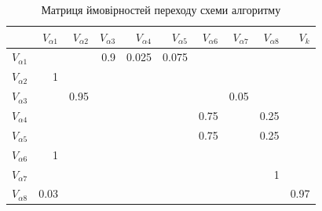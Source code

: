 \documentclass[
	a4paper,
	oneside,
	BCOR = 10mm,
	DIV = 12,
	12pt,
	headings = normal,
]{scrartcl}
\begin{document}
			\begin{table}[!htbp]
				\centering
				\caption{Матриця ймовірностей переходу схеми алгоритму}
				\label{tab:transition-prob}
				\begin{tabular}{
					l
					*{9}{r}
				}
					\toprule
						& $V_{\alpha{}1}$ & $V_{\alpha{}2}$ & $V_{\alpha{}3}$ & $V_{\alpha{}4}$ & $V_{\alpha{}5}$ & $V_{\alpha{}6}$ & $V_{\alpha{}7}$ & $V_{\alpha{}8}$ & $V_{k}$ \\ 
					\midrule
						$V_{\alpha{}1}$ & & & \num{0.9} & \num{0.025} & \num{0.075}\\
						$V_{\alpha{}2}$ & \num{1} \\
						$V_{\alpha{}3}$ & & \num{0.95} & & & & & \num{0.05} \\
						$V_{\alpha{}4}$ & & & & & & \num{0.75} & & \num{0.25}\\
						$V_{\alpha{}5}$ & & & & & & \num{0.75} & & \num{0.25}\\
						$V_{\alpha{}6}$ & \num{1} \\
						$V_{\alpha{}7}$ & & & & & & & & \num{1} & \\
						$V_{\alpha{}8}$ & \num{0.03} & & & & & & & & \num{0.97} \\
					\bottomrule
				\end{tabular}
			\end{table}
\end{document}
